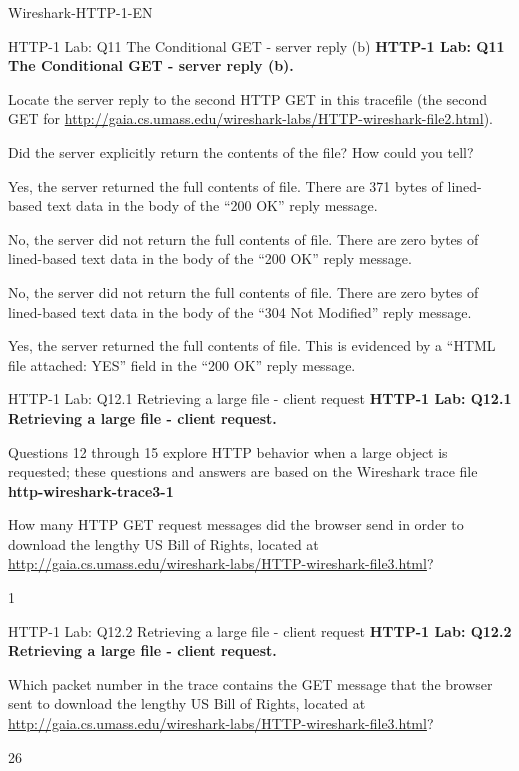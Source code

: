 \documentclass[a4paper]{article}
\begin{document}
\begin{quiz}{Wireshark-HTTP-1-EN}
\begin{multi}[points=1,shuffle]{HTTP-1 Lab: Q11 The Conditional GET - server reply (b)}
\textbf{HTTP-1 Lab: Q11 The Conditional GET - server reply (b).} 

Locate the server reply to the second HTTP GET in this tracefile (the second GET for \href{http://gaia.cs.umass.edu/wireshark-labs/HTTP-wireshark-file2.html}{http://gaia.cs.umass.edu/wireshark-labs/HTTP-wireshark-file2.html}). 

Did the server explicitly return the contents of the file? How could you tell? 
\item Yes, the server returned the full contents of file. There are 371 bytes of lined-based text data in the body of the ``200 OK'' reply message.
\item No, the server did not return the full contents of file. There are zero bytes of lined-based text data in the body of the ``200 OK'' reply message.
\item* No, the server did not return the full contents of file. There are zero bytes of lined-based text data in the body of the ``304 Not Modified'' reply message.
\item Yes, the server returned the full contents of file. This is evidenced by a ``HTML file attached: YES'' field in the ``200 OK'' reply message.
\end{multi}

\begin{shortanswer}[points=1]{HTTP-1 Lab: Q12.1 Retrieving a large file - client request}
\textbf{HTTP-1 Lab: Q12.1 Retrieving a large file - client request.} 

Questions 12 through 15 explore HTTP behavior when a large object is requested; these questions and answers are based on the Wireshark trace file \textbf{http-wireshark-trace3-1}

How many HTTP GET request messages did the browser send in order to download the lengthy US Bill of Rights, located at \href{http://gaia.cs.umass.edu/wireshark-labs/HTTP-wireshark-file3.html}{http://gaia.cs.umass.edu/wireshark-labs/HTTP-wireshark-file3.html}?
\item 1
\end{shortanswer}

\begin{shortanswer}[points=1]{HTTP-1 Lab: Q12.2 Retrieving a large file - client request}
\textbf{HTTP-1 Lab: Q12.2 Retrieving a large file - client request.} 

Which packet number in the trace contains the GET message that the browser sent to download the lengthy US Bill of Rights, located at \href{http://gaia.cs.umass.edu/wireshark-labs/HTTP-wireshark-file3.html}{http://gaia.cs.umass.edu/wireshark-labs/HTTP-wireshark-file3.html}? 
\item 26
\end{shortanswer}


\end{quiz}
\end{document}
